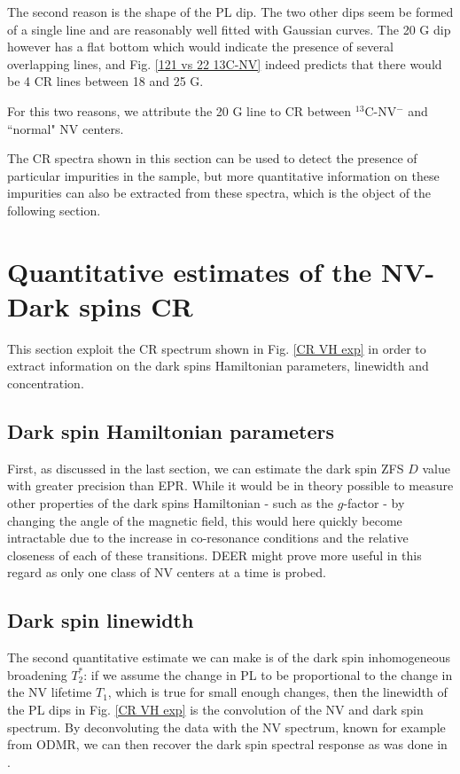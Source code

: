 \documentclass[a4paper,11pt]{report}
\begin{document}
The second reason is the shape of the PL dip. The two other dips seem be formed of a single line and are reasonably well fitted with Gaussian curves. The 20 G dip however has a flat bottom which would indicate the presence of several overlapping lines, and Fig. \ref{121 vs 22 13C-NV} indeed predicts that there would be 4 CR lines between 18 and 25 G.

For this two reasons, we attribute the 20 G line to CR between $^{13}$C-NV$^-$ and ``normal" NV centers.

\bigskip

The CR spectra shown in this section can be used to detect the presence of particular impurities in the sample, but more quantitative information on these impurities can also be extracted from these spectra, which is the object of the following section.

\section{Quantitative estimates of the NV-Dark spins CR}

This section exploit the CR spectrum shown in Fig. \ref{CR VH exp} in order to extract information on the dark spins Hamiltonian parameters, linewidth and concentration.

\subsection{Dark spin Hamiltonian parameters}

First, as discussed in the last section, we can estimate the dark spin ZFS $D$ value with greater precision than EPR. While it would be in theory possible to measure other properties of the dark spins Hamiltonian - such as the $g$-factor - by changing the angle of the magnetic field, this would here quickly become intractable due to the increase in co-resonance conditions and the relative closeness of each of these transitions. DEER might prove more useful in this regard as only one class of NV centers at a time is probed.

\subsection{Dark spin linewidth}

The second quantitative estimate we can make is of the dark spin inhomogeneous broadening $T_2^*$: if we assume the change in PL to be proportional to the change in the NV lifetime $T_1$, which is true for small enough changes, then the linewidth of the PL dips in Fig. \ref{CR VH exp} is the convolution of the NV and dark spin spectrum. By deconvoluting the data with the NV spectrum, known for example from ODMR, we can then recover the dark spin spectral response as was done in \citep{hall2016detection}. 
\end{document}
